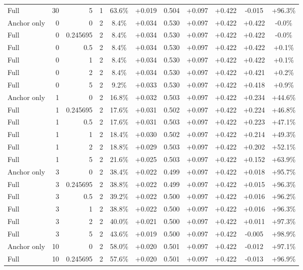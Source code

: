 \begin{table}[htbp]
\begin{tabular}{lrrrccccccc}
Full & 30 & 5 & 1 & 63.6\% & +0.019 & 0.504 & +0.097 & +0.422 & -0.015 & +96.3\% \\
Anchor only & 0 & 0 & 2 & 8.4\% & +0.034 & 0.530 & +0.097 & +0.422 & +0.422 & -0.0\% \\
Full & 0 & 0.245695 & 2 & 8.4\% & +0.034 & 0.530 & +0.097 & +0.422 & +0.422 & -0.0\% \\
Full & 0 & 0.5 & 2 & 8.4\% & +0.034 & 0.530 & +0.097 & +0.422 & +0.422 & +0.1\% \\
Full & 0 & 1 & 2 & 8.4\% & +0.034 & 0.530 & +0.097 & +0.422 & +0.422 & +0.1\% \\
Full & 0 & 2 & 2 & 8.4\% & +0.034 & 0.530 & +0.097 & +0.422 & +0.421 & +0.2\% \\
Full & 0 & 5 & 2 & 9.2\% & +0.033 & 0.530 & +0.097 & +0.422 & +0.418 & +0.9\% \\
Anchor only & 1 & 0 & 2 & 16.8\% & +0.032 & 0.503 & +0.097 & +0.422 & +0.234 & +44.6\% \\
Full & 1 & 0.245695 & 2 & 17.6\% & +0.031 & 0.502 & +0.097 & +0.422 & +0.224 & +46.8\% \\
Full & 1 & 0.5 & 2 & 17.6\% & +0.031 & 0.503 & +0.097 & +0.422 & +0.223 & +47.1\% \\
Full & 1 & 1 & 2 & 18.4\% & +0.030 & 0.502 & +0.097 & +0.422 & +0.214 & +49.3\% \\
Full & 1 & 2 & 2 & 18.8\% & +0.029 & 0.503 & +0.097 & +0.422 & +0.202 & +52.1\% \\
Full & 1 & 5 & 2 & 21.6\% & +0.025 & 0.503 & +0.097 & +0.422 & +0.152 & +63.9\% \\
Anchor only & 3 & 0 & 2 & 38.4\% & +0.022 & 0.499 & +0.097 & +0.422 & +0.018 & +95.7\% \\
Full & 3 & 0.245695 & 2 & 38.8\% & +0.022 & 0.499 & +0.097 & +0.422 & +0.015 & +96.3\% \\
Full & 3 & 0.5 & 2 & 39.2\% & +0.022 & 0.500 & +0.097 & +0.422 & +0.016 & +96.2\% \\
Full & 3 & 1 & 2 & 38.8\% & +0.022 & 0.500 & +0.097 & +0.422 & +0.016 & +96.3\% \\
Full & 3 & 2 & 2 & 40.0\% & +0.021 & 0.500 & +0.097 & +0.422 & +0.011 & +97.3\% \\
Full & 3 & 5 & 2 & 43.6\% & +0.019 & 0.500 & +0.097 & +0.422 & -0.005 & +98.9\% \\
Anchor only & 10 & 0 & 2 & 58.0\% & +0.020 & 0.501 & +0.097 & +0.422 & -0.012 & +97.1\% \\
Full & 10 & 0.245695 & 2 & 57.6\% & +0.020 & 0.501 & +0.097 & +0.422 & -0.013 & +96.9\% \\

\end{tabular}
\end{table}
